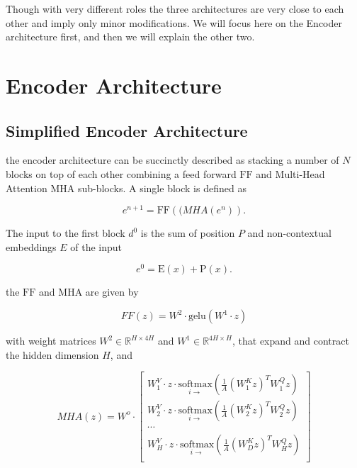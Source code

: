Though with very different roles the three architectures are very close to each other and imply only minor modifications. We will focus here on the Encoder architecture first, and then we will explain the other two.

\section{Encoder Architecture}

\subsection{Simplified Encoder Architecture}

the encoder architecture can be succinctly described as stacking a number of $N$ blocks on top of each other combining a feed forward $\mathrm{FF}$ and Multi-Head Attention $\mathrm{MHA}$ sub-blocks. A single block is defined as

\begin{equation}
e^{n+1} = \mathrm{FF}(\mathrm(MHA(e^n)).
\end{equation}

The input to the first block $d^0$ is the sum of position $P$ and non-contextual embeddings $E$ of the input

\begin{equation}
e^{0} = \mathrm{E}(x) + \mathrm{P}(x).
\end{equation}

the $\mathrm{FF}$ and $\mathrm{MHA}$ are given by

\begin{equation}
FF(z) = W^2\cdot \mathrm{gelu}(W^1 \cdot z)
\end{equation}

\noindent with weight matrices $W^2 \in \mathbb{R}^{H \times 4H}$ and $W^1 \in \mathbb{R}^{4H \times H}$, that expand and contract the hidden dimension $H$, and

\begin{equation}
MHA(z) =  W^o \cdot
\begin{bmatrix}
    W^V_1 \cdot z \cdot \underset{i \rightarrow}{\mathrm{softmax}}\left( \frac{1}{A} \left(W^K_1 z\right)^T W^Q_1 z \right)\\
    W^V_2 \cdot z \cdot \underset{i \rightarrow}{\mathrm{softmax}}\left( \frac{1}{A} \left(W^K_2 z\right)^T W^Q_2 z \right)\\
    \cdots\\
    W^V_H \cdot z \cdot \underset{i \rightarrow}{\mathrm{softmax}}\left( \frac{1}{A} \left(W^K_D z\right)^T W^Q_H z \right)\\
\end{bmatrix}\nonumber
\end{equation}

